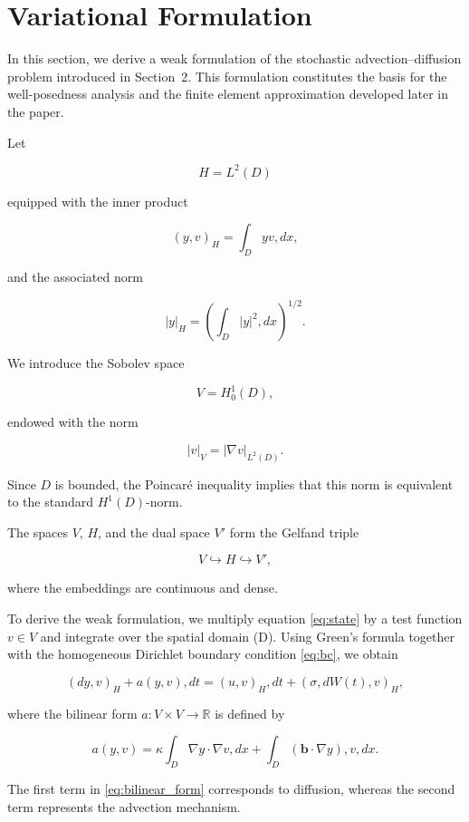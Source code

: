 \section{Variational Formulation}

In this section, we derive a weak formulation of the stochastic advection--diffusion problem introduced in 
Section~2. This formulation constitutes the basis for the well-posedness analysis and the finite element 
approximation developed later in the paper.

Let

\[
H=L^2(D)
\]

equipped with the inner product

\[
(y,v)_H
=
\int_D yv,dx,
\]

and the associated norm

\[
|y|_H
=
\left(
\int_D |y|^2,dx
\right)^{1/2}.
\]

We introduce the Sobolev space

\[
V=H_0^1(D),
\]

endowed with the norm

\[
|v|_V
=
|\nabla v|_{L^2(D)}.
\]

Since \(D\) is bounded, the Poincaré inequality implies that this norm is equivalent to the standard 
\(H^1(D)\)-norm.

The spaces \(V\), \(H\), and the dual space \(V'\) form the Gelfand triple

\[
V
\hookrightarrow
H
\hookrightarrow
V',
\]

where the embeddings are continuous and dense.

To derive the weak formulation, we multiply equation \eqref{eq:state} by a test function \(v\in V\) 
and integrate over the spatial domain (D). Using Green's formula together with the homogeneous Dirichlet boundary condition \eqref{eq:bc}, we obtain

\[
(dy,v)_H
+
a(y,v),dt
=
(u,v)_H,dt
+
(\sigma,dW(t),v)_H,
\]

where the bilinear form \(a:V\times V\rightarrow\mathbb{R}\) is defined by

\begin{equation}
a(y,v)
=
\kappa
\int_D
\nabla y\cdot\nabla v,dx
+
\int_D
(\mathbf b\cdot\nabla y),v,dx.
\label{eq:bilinear_form}
\end{equation}

The first term in \eqref{eq:bilinear_form} corresponds to diffusion, whereas the second term represents 
the advection mechanism.

